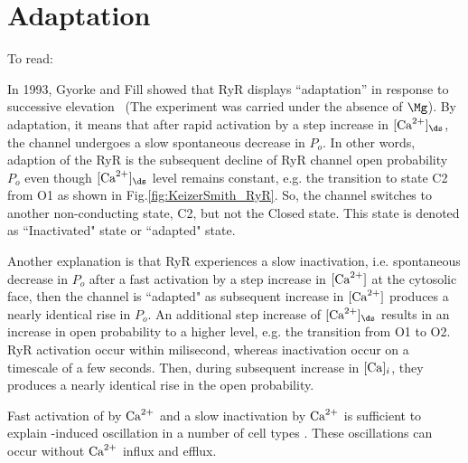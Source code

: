 

\section{Adaptation}
\label{sec:RyR_adaptation}

To read: \citep{Velez1997}

In 1993, Gyorke and Fill showed that RyR displays ``adaptation'' in response to
successive  elevation~\citep{gyorke1993ryr} (The experiment was
carried under the absence of $\Mg$).
By adaptation, it means that after rapid activation by a step increase in
$[\Ca]_\ds$, the channel undergoes a slow spontaneous decrease in $P_o$.
In other words, adaption of the RyR is the subsequent decline of RyR channel
open probability $P_o$ even though $[\Ca]_\ds$ level remains constant, e.g. the
transition to state C2 from O1 as shown in Fig.\ref{fig:KeizerSmith_RyR}.
So, the channel switches to another non-conducting state, C2, but not the
Closed state. This state is denoted as ``Inactivated" state or ``adapted" state.

Another explanation is that RyR experiences a slow inactivation, i.e.
spontaneous decrease in $P_o$ after a fast activation by a step increase in
$[{\text{Ca}^{2+}}]$ at the cytosolic face, then the channel is ``adapted" as subsequent
increase in $[{\text{Ca}^{2+}}]$ produces a nearly identical rise in $P_o$.
An additional step increase of $[\Ca]_\ds$ results in an increase in open
probability to a higher level, e.g. the transition from O1 to O2. RyR activation
occur within milisecond, whereas inactivation occur on a timescale of a few
seconds. Then, during subsequent increase in $[\ce{Ca}]_i$, they produces a
nearly identical rise in the open probability.


\begin{framed}
Fast activation of \tIPthreeR by ${\text{Ca}^{2+}}$ and a slow inactivation by ${\text{Ca}^{2+}}$ is
sufficient to explain \IPthree-induced oscillation in a number of cell types
\citep{deyoung1992spip3, atri1993spm}. These oscillations can occur without
${\text{Ca}^{2+}}$ influx and efflux.
\end{framed}

